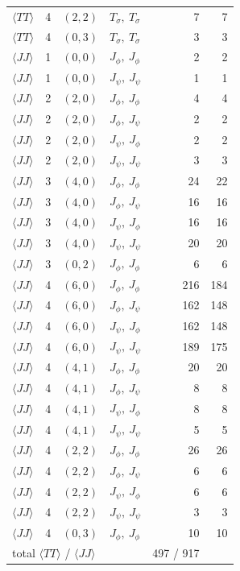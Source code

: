 \begin{center}
\begin{longtable}{llllrr}
$\langle TT\rangle$ & 4 & $(2,2)$ & $T_\sigma,\ T_\sigma$ & 7 & 7\\
$\langle TT\rangle$ & 4 & $(0,3)$ & $T_\sigma,\ T_\sigma$ & 3 & 3\\
$\langle JJ\rangle$ & 1 & $(0,0)$ & $J_\phi,\ J_\phi$ & 2 & 2\\
$\langle JJ\rangle$ & 1 & $(0,0)$ & $J_\psi,\ J_\psi$ & 1 & 1\\
$\langle JJ\rangle$ & 2 & $(2,0)$ & $J_\phi,\ J_\phi$ & 4 & 4\\
$\langle JJ\rangle$ & 2 & $(2,0)$ & $J_\phi,\ J_\psi$ & 2 & 2\\
$\langle JJ\rangle$ & 2 & $(2,0)$ & $J_\psi,\ J_\phi$ & 2 & 2\\
$\langle JJ\rangle$ & 2 & $(2,0)$ & $J_\psi,\ J_\psi$ & 3 & 3\\
$\langle JJ\rangle$ & 3 & $(4,0)$ & $J_\phi,\ J_\phi$ & 24 & 22\\
$\langle JJ\rangle$ & 3 & $(4,0)$ & $J_\phi,\ J_\psi$ & 16 & 16\\
$\langle JJ\rangle$ & 3 & $(4,0)$ & $J_\psi,\ J_\phi$ & 16 & 16\\
$\langle JJ\rangle$ & 3 & $(4,0)$ & $J_\psi,\ J_\psi$ & 20 & 20\\
$\langle JJ\rangle$ & 3 & $(0,2)$ & $J_\phi,\ J_\phi$ & 6 & 6\\
$\langle JJ\rangle$ & 4 & $(6,0)$ & $J_\phi,\ J_\phi$ & 216 & 184\\
$\langle JJ\rangle$ & 4 & $(6,0)$ & $J_\phi,\ J_\psi$ & 162 & 148\\
$\langle JJ\rangle$ & 4 & $(6,0)$ & $J_\psi,\ J_\phi$ & 162 & 148\\
$\langle JJ\rangle$ & 4 & $(6,0)$ & $J_\psi,\ J_\psi$ & 189 & 175\\
$\langle JJ\rangle$ & 4 & $(4,1)$ & $J_\phi,\ J_\phi$ & 20 & 20\\
$\langle JJ\rangle$ & 4 & $(4,1)$ & $J_\phi,\ J_\psi$ & 8 & 8\\
$\langle JJ\rangle$ & 4 & $(4,1)$ & $J_\psi,\ J_\phi$ & 8 & 8\\
$\langle JJ\rangle$ & 4 & $(4,1)$ & $J_\psi,\ J_\psi$ & 5 & 5\\
$\langle JJ\rangle$ & 4 & $(2,2)$ & $J_\phi,\ J_\phi$ & 26 & 26\\
$\langle JJ\rangle$ & 4 & $(2,2)$ & $J_\phi,\ J_\psi$ & 6 & 6\\
$\langle JJ\rangle$ & 4 & $(2,2)$ & $J_\psi,\ J_\phi$ & 6 & 6\\
$\langle JJ\rangle$ & 4 & $(2,2)$ & $J_\psi,\ J_\psi$ & 3 & 3\\
$\langle JJ\rangle$ & 4 & $(0,3)$ & $J_\phi,\ J_\phi$ & 10 & 10\\
\midrule
\multicolumn{4}{l}{total $\langle TT\rangle$ / $\langle JJ\rangle$} & 497 / 917 & \\
\bottomrule
\end{longtable}
\end{center}

